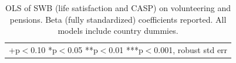 \documentclass[10pt, letterpaper]{article}
\begin{document}
\begin{spacing}{1.4}


\begin{spacing}{.9}
\begin{table}[H]\centering \caption{OLS of SWB (life satisfaction and CASP) on
    volunteering and pensions. Beta (fully standardized) coefficients reported. All models
    include country dummies.}  \begin{scriptsize} \begin{tabular}{p{1.8in}p{.5in}p{.5in}|p{.5in}p{.5in}}\hline 
      \hline\multicolumn{5}{l}{+p$<$0.10 *p$<$0.05 **p$<$0.01 ***p$<$0.001,
        robust std err} \end{tabular}\label{regCw6} \end{scriptsize}\end{table}
\end{spacing}




\end{spacing}
\end{document}
